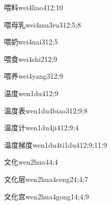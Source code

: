 \begin{verbete}{喂料}{wei4liao4}{12;10}
\end{verbete}

\begin{verbete}{喂母乳}{wei4mu3ru3}{12;5;8}
\end{verbete}

\begin{verbete}{喂奶}{wei4nai3}{12;5}
\end{verbete}

\begin{verbete}{喂食}{wei4shi2}{12;9}
\end{verbete}

\begin{verbete}{喂养}{wei4yang3}{12;9}
\end{verbete}

\begin{verbete}{温度}{wen1du4}{12;9}
\end{verbete}

\begin{verbete}{温度表}{wen1du4biao3}{12;9;8}
\end{verbete}

\begin{verbete}{温度计}{wen1du4ji4}{12;9;4}
\end{verbete}

\begin{verbete}{温度梯度}{wen1du4ti1du4}{12;9;11;9}
\end{verbete}

\begin{verbete}{文化}{wen2hua4}{4;4}
\end{verbete}

\begin{verbete}{文化层}{wen2hua4ceng2}{4;4;7}
\end{verbete}

\begin{verbete}{文化宫}{wen2hua4gong1}{4;4;9}
\end{verbete}

